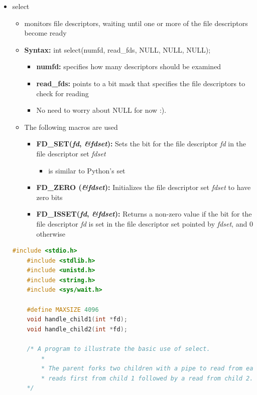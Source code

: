 \documentclass[12pt]{article}
\begin{document}
\begin{itemize}
    \item select
    \begin{itemize}
        \item monitors file descriptors, waiting until one or more of the file
        descriptors become ready
        \item \textbf{Syntax:} int select(numfd, read\_fds, NULL, NULL, NULL);
        \begin{itemize}
            \item \textbf{numfd:} specifies how many descriptors should be examined
            \item \textbf{read\_fds:} points to a bit mask that specifies the file descriptors to check for reading
            \item No need to worry about NULL for now :).
        \end{itemize}
        \item The following macros are used
        \begin{itemize}
            \item \textbf{FD\_SET(\textit{fd}, \textit{\&fdset}):} Sets the bit for the file descriptor \textit{fd} in the file descriptor set \textit{fdset}
            \begin{itemize}
                \item is similar to Python's set
            \end{itemize}
            \item \textbf{FD\_ZERO (\textit{\&fdset}):} Initializes the file descriptor set \textit{fdset} to have zero bits
            \item \textbf{FD\_ISSET(\textit{fd}, \textit{\&fdset}):} Returns a non-zero value if the bit for the file descriptor \textit{fd}
            is set in the file descriptor set pointed by \textit{fdset}, and 0 otherwise
        \end{itemize}
    \end{itemize}


    \begin{lstlisting}[language=c, caption={select\_example\_2\_1.c}]
    #include <stdio.h>
    #include <stdlib.h>
    #include <unistd.h>
    #include <string.h>
    #include <sys/wait.h>

    #define MAXSIZE 4096
    void handle_child1(int *fd);
    void handle_child2(int *fd);

    /* A program to illustrate the basic use of select.
        *
        * The parent forks two children with a pipe to read from each of them and then
        * reads first from child 1 followed by a read from child 2.
    */


\end{lstlisting}
\end{itemize}
\end{document}
